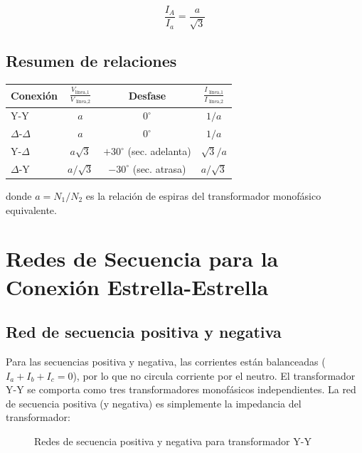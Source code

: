 \documentclass[12pt,a4paper]{article}
\begin{document}
\[
\frac{I_A}{I_a} = \frac{a}{\sqrt{3}}
\]

\subsection{Resumen de relaciones}

\begin{center}
\begin{tabular}{lccc}
\toprule
Conexión & $\displaystyle\frac{V_{\text{línea,1}}}{V_{\text{ línea,2}}}$ & Desfase & $\displaystyle\frac{I_{\text{ línea,1}}}{I_{\text{ línea,2}}}$ \\
\midrule
Y-Y  & $a$              & $0^\circ$  & $1/a$ \\
$\Delta$-$\Delta$ & $a$     & $0^\circ$  & $1/a$ \\
Y-$\Delta$ & $a\sqrt{3}$ & $+30^\circ$ (sec. adelanta) & $\sqrt{3}/a$ \\
$\Delta$-Y & $a/\sqrt{3}$ & $-30^\circ$ (sec. atrasa) & $a/\sqrt{3}$ \\
\bottomrule
\end{tabular}
\end{center}

donde $a = N_1/N_2$ es la relación de espiras del transformador monofásico equivalente.

\newpage
\section{Redes de Secuencia para la Conexión Estrella-Estrella}

\subsection{Red de secuencia positiva y negativa}

Para las secuencias positiva y negativa, las corrientes están balanceadas ($I_a + I_b + I_c = 0$), por lo que no circula corriente por el neutro. El transformador Y-Y se comporta como tres transformadores monofásicos independientes. La red de secuencia positiva (y negativa) es simplemente la impedancia del transformador:

\begin{figure}[h]
\centering
{}
\caption{Redes de secuencia positiva y negativa para transformador Y-Y}
\end{figure}
\end{document}

